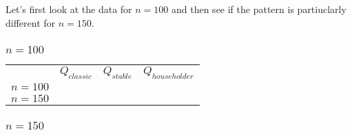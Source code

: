 \documentclass[a4paper,11pt]{article}
\begin{document}
Let's first look at the data for $n=100$ and then see if
the pattern is partiuclarly different for $n=150$.

\subsubsection{$n=100$}

\begin{tabular}{r|c|c|c|}
  \multicolumn{1}{r}{}
   & \multicolumn{1}{c}{$Q_{classic}$ }
   & \multicolumn{1}{c}{$Q_{stable}$}
   & \multicolumn{1}{c}{$Q_{householder}$} \\
  \cline{2-4}
  $n=100$ & 
          & 
          & 
          \\ \cline{2-4}
  $n=150$ & 
          & 
          & 
          \\ \cline{2-4}
\end{tabular}




\subsubsection{$n=150$}


\end{document}
